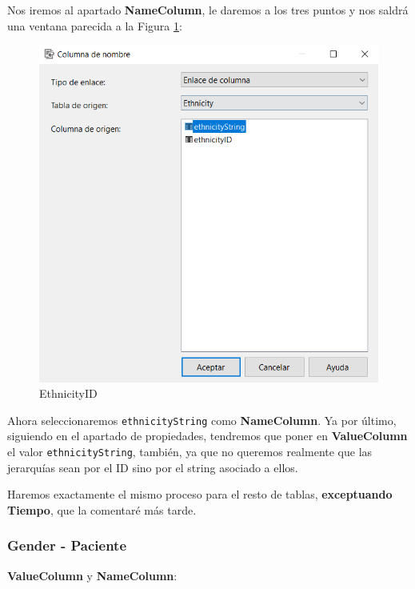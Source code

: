 \documentclass[12pt, a4paper, twoside]{article}
\begin{document}
Nos iremos al apartado \textbf{NameColumn}, le daremos a los tres puntos y nos saldrá una ventana parecida a la Figura \ref{fig:13}: 

\begin{figure}[H]
	\centering
	\includegraphics[width=1\textwidth]{image/EthnicityID2}
	\caption{EthnicityID}
	\label{fig:13}
\end{figure}

Ahora seleccionaremos \texttt{ethnicityString} como \textbf{NameColumn}. Ya por último, siguiendo en el apartado de propiedades, tendremos que poner en \textbf{ValueColumn} el valor \texttt{ethnicityString}, también, ya que no queremos realmente que las jerarquías sean por el ID sino por el string asociado a ellos.

Haremos exactamente el mismo proceso para el resto de tablas, \textbf{exceptuando Tiempo}, que la comentaré más tarde.

\subsubsection{Gender - Paciente}

\textbf{ValueColumn} y \textbf{NameColumn}:
\end{document}
